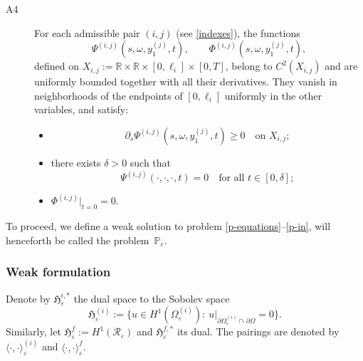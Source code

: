 \documentclass[reqno]{amsart}            %
\numberwithin{equation}{section}
\begin{document}
\begin{description}
		\item[A4]
		For each admissible pair $(i,j)$ (see \eqref{indexes}), the functions
		\[
		\Psi^{(i,j)}(s,\omega,y^{(j)}_1,t),\qquad
		\Phi^{(i,j)}(s,\omega,y^{(j)}_1,t),
		\]
		defined on $X_{i,j}:=\mathbb{R}\times\mathbb{R}\times[0,\ell_i]\times[0,T]$,
		belong to $C^2(X_{i,j})$ and are uniformly bounded together with all their
		derivatives. They vanish in neighborhoods of the endpoints of $[0,\ell_i]$
		uniformly in the other variables, and satisfy:
		\begin{itemize}
			\item
			\begin{equation}\label{pos-2}
				\partial_s\Psi^{(i,j)}(s,\omega,y^{(j)}_1,t)\ge 0
				\quad\text{on } X_{i,j};
			\end{equation}
			\item
			there exists $\delta>0$ such that
			\begin{equation}\label{comp-cond-Psi}
				\Psi^{(i,j)}(\cdot,\cdot,\cdot,t)=0
				\quad\text{for all } t\in[0,\delta];
			\end{equation}
			\item
			$\Phi^{(i,j)}|_{t=0}=0$.
		\end{itemize}
	\end{description}
	
	
	To proceed, we define a weak solution to problem \eqref{p-equations}--\eqref{p-in}, will henceforth be called the problem~$\mathbb {P}_\varepsilon.$
	
	\subsubsection*{Weak formulation}	Denote by $\mathfrak{H}^{i, *}_\varepsilon$ the dual space to the Sobolev space 
	$$
	\mathfrak{H}^{(i)}_\varepsilon := \big\{u\in H^1(\Omega^{(i)}_\varepsilon)\colon \ {u}\big|_{\partial\Omega^{(i)}_\varepsilon \cap\,  \partial\Omega} = 0\big\}.
	$$ 
	Similarly, let $\mathfrak{H}^f_\varepsilon :=H^1(\mathcal{R}_\varepsilon)$
	and $\mathfrak{H}^{f,*}_\varepsilon$ its dual.
	The pairings are denoted by
	$\langle\cdot,\cdot\rangle_\varepsilon^{(i)}$ and
	$\langle\cdot,\cdot\rangle_\varepsilon^{f}$.
	
\end{document}
